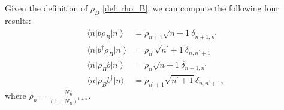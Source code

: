 \documentclass[../../note.tex]{subfiles}
\begin{document}
\begin{lemma}
    Given the definition of $\rho_B$ \ref{def: rho_B}, we can compute the following four results:
    \begin{align}
        \langle n \vert b \rho_B \vert n^\prime \rangle 
        &= \rho_{n+1} \sqrt{n+1} \delta_{n+1, n^\prime} \\
        \langle n \vert b^\dagger \rho_B \vert n^\prime \rangle 
        &= \rho_{n^\prime} \sqrt{n^\prime + 1} \delta_{n, n^\prime + 1} \\
        \langle n \vert \rho_B b \vert n^\prime \rangle 
        &= \rho_n \sqrt{n+1} \delta_{n+1, n^\prime} \\
        \langle n \vert \rho_B b^\dagger \vert n \rangle 
        &= \rho_{n^\prime + 1} \sqrt{n^\prime + 1} \delta_{n, n^\prime + 1},
    \end{align}
    where $\rho_n = \frac{N_B^n}{(1 + N_B)^{1+n}}$.
\end{lemma}
\end{document}
